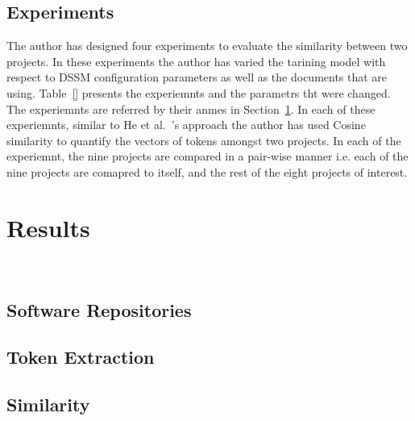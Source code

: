 \documentclass[conference]{IEEEtran}
\begin{document}
\subsection{Experiments}
\label{exp}

The author has designed four experiments to evaluate the similarity between two projects. In these experiments the author has varied the tarining model with respect to DSSM configuration parameters as well as the documents that are using. Table~\ref{} presents the experiemnts and the parametrs tht were changed. The experiemnts are referred by their anmes in Section~\ref{results}. 
In each of these experiemnts, similar to He et al.~\cite{}'s approach the author has used Cosine similarity to quantify the vectors of tokens amongst two projects. In each of the experiemnt, the nine projects are compared in a pair-wise manner i.e. each of the nine projects are comapred to itself, and the rest of the eight projects of interest.   
 
 
\section{Results}
\label{results}

~\cite{Banich:1998}  

\subsection{Software Repositories}
\label{res_proj_collect}



\subsection{Token Extraction}
\label{res_token_extract}



\subsection{Similarity}
\label{res_similarity}




\end{document}
